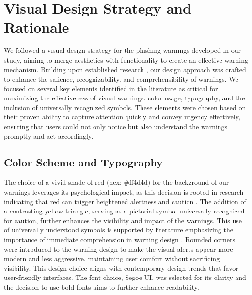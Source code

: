 \documentclass[
  a4paper,  %
  twoside,  %
  bibliography=totoc,
  headsepline,
  cleardoublepage=empty,
  parskip=half,
  draft=false
]{scrbook}
\begin{document}
\section{Visual Design Strategy and Rationale}
We followed a visual design strategy for the phishing warnings developed in our study, aiming to merge aesthetics with functionality to create an effective warning mechanism. Building upon established research \cite{wogalter2002}, our design approach was crafted to enhance the salience, recognizability, and comprehensibility of warnings. We focused on several key elements identified in the literature as critical for maximizing the effectiveness of visual warnings: color usage, typography, and the inclusion of universally recognized symbols. These elements were chosen based on their proven ability to capture attention quickly and convey urgency effectively, ensuring that users could not only notice but also understand the warnings promptly and act accordingly.

\subsection{Color Scheme and Typography}
The choice of a vivid shade of red (hex: \#ff4d4d) for the background of our warnings leverages its psychological impact, as this decision is rooted in research indicating that red can trigger heightened alertness and caution \cite{kuniecki, wogalter2002}. The addition of a contrasting yellow triangle, serving as a pictorial symbol universally recognized for caution, further enhances the visibility and impact of the warnings. This use of universally understood symbols is supported by literature emphasizing the importance of immediate comprehension in warning design \cite{wogalter2002}. \newline
Rounded corners were introduced to the warning design to make the visual alerts appear more modern and less aggressive, maintaining user comfort without sacrificing visibility. This design choice aligns with contemporary design trends that favor user-friendly interfaces. \newline
The font choice, Segoe UI, was selected for its clarity and the decision to use bold fonts aims to further enhance readability.
\end{document}
